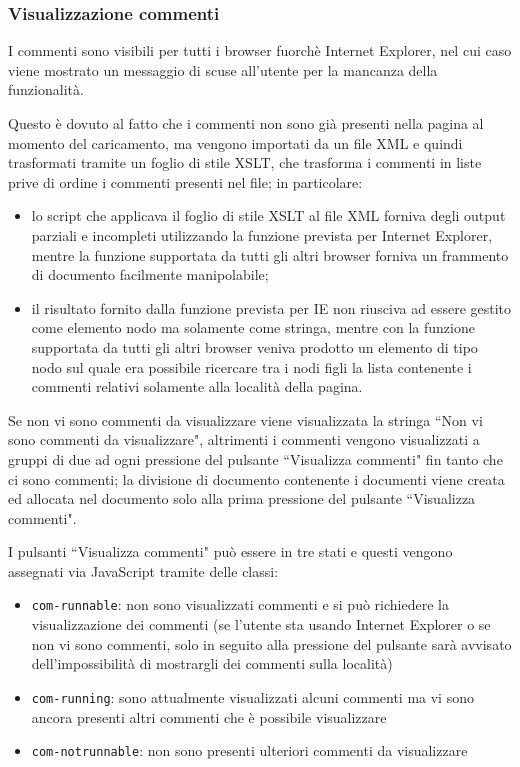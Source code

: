 \subsubsection{Visualizzazione commenti}
I commenti sono visibili per tutti i browser fuorchè Internet Explorer, nel
cui caso viene mostrato un messaggio di scuse all'utente per la mancanza della
funzionalità.

Questo è dovuto al fatto che i commenti non sono già presenti nella pagina al
momento del caricamento, ma vengono importati da un file XML e quindi
trasformati tramite un foglio di stile XSLT, che trasforma i commenti in liste
prive di ordine i commenti presenti nel file; in particolare:
\begin{itemize}
\item lo script che applicava il foglio di stile XSLT al file XML forniva
degli output parziali e incompleti utilizzando la funzione prevista per
Internet Explorer, mentre la funzione supportata da tutti gli altri browser
forniva un frammento di documento facilmente manipolabile;
\item il risultato fornito dalla funzione prevista per IE non riusciva ad
essere gestito come elemento nodo ma solamente come stringa, mentre con
la funzione supportata da tutti gli altri browser veniva prodotto un elemento
di tipo nodo sul quale era possibile ricercare tra i nodi figli la lista
contenente i commenti relativi solamente alla località della pagina.
\end{itemize}

Se non vi sono commenti da visualizzare viene visualizzata la stringa
``Non vi sono commenti da visualizzare", altrimenti i commenti vengono
visualizzati a gruppi di due ad ogni pressione del pulsante
``Visualizza commenti" fin tanto che ci sono commenti; la divisione di
documento contenente i documenti viene creata ed allocata nel documento solo
alla prima pressione del pulsante ``Visualizza commenti".

I pulsanti ``Visualizza commenti" può essere in tre stati e questi vengono
assegnati via JavaScript tramite delle classi:
\begin{itemize}
\item \texttt{com-runnable}: non sono visualizzati commenti e si può
richiedere la visualizzazione dei commenti (se l'utente sta usando
Internet Explorer o se non vi sono commenti, solo in seguito alla pressione
del pulsante sarà avvisato dell'impossibilità di mostrargli dei commenti sulla
località)
\item \texttt{com-running}: sono attualmente visualizzati alcuni commenti ma vi
sono ancora presenti altri commenti che è possibile visualizzare
\item \texttt{com-notrunnable}: non sono presenti ulteriori commenti da
visualizzare
\end{itemize}


